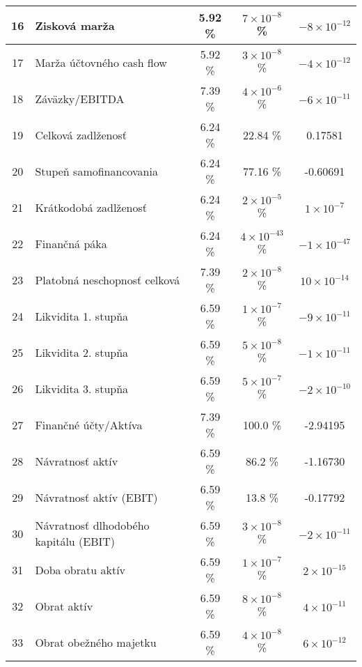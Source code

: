\begin{longtable}{ |c|p{5cm}|c|c|c| }
        \hline
        16 & Zisková marža & 5.92 \% & \(7 \times 10^{-8}\) \% & \(-8 \times 10^{-12}\) \\
        \hline
        17 & Marža účtovného cash flow & 5.92 \% & \(3 \times 10^{-8}\) \% & \(-4 \times 10^{-12}\) \\
        \hline
        18 & Záväzky/EBITDA & 7.39 \% & \(4 \times 10^{-6}\) \% & \(-6 \times 10^{-11}\) \\
        \hline
        19 & Celková zadlženosť & 6.24 \% & 22.84 \% & 0.17581 \\
        \hline
        20 & Stupeň samofinancovania & 6.24 \% & 77.16 \% & -0.60691 \\
        \hline
        21 & Krátkodobá zadlženosť & 6.24 \% & \(2 \times 10^{-5}\) \% & \(1 \times 10^{-7}\) \\
        \hline
        22 & Finančná páka & 6.24 \% & \(4 \times 10^{-43}\) \% & \(-1 \times 10^{-47}\) \\
        \hline
        23 & Platobná neschopnosť celková & 7.39 \% & \(2 \times 10^{-8}\) \% & \(10 \times 10^{-14}\) \\
        \hline
        24 & Likvidita 1. stupňa & 6.59 \% & \(1 \times 10^{-7}\) \% & \(-9 \times 10^{-11}\) \\
        \hline
        25 & Likvidita 2. stupňa & 6.59 \% & \(5 \times 10^{-8}\) \% & \(-1 \times 10^{-11}\) \\
        \hline
        26 & Likvidita 3. stupňa & 6.59 \% & \(5 \times 10^{-7}\) \% & \(-2 \times 10^{-10}\) \\
        \hline
        27 & Finančné účty/Aktíva & 7.39 \% & 100.0 \% & -2.94195 \\
        \hline
        28 & Návratnosť aktív & 6.59 \% & 86.2 \% & -1.16730 \\
        \hline
        29 & Návratnosť aktív (EBIT) & 6.59 \% & 13.8 \% & -0.17792 \\
        \hline
        30 & Návratnosť dlhodobého kapitálu (EBIT) & 6.59 \% & \(3 \times 10^{-8}\) \% & \(-2 \times 10^{-11}\) \\
        \hline
        31 & Doba obratu aktív & 6.59 \% & \(1 \times 10^{-7}\) \% & \(2 \times 10^{-15}\) \\
        \hline
        32 & Obrat aktív & 6.59 \% & \(8 \times 10^{-8}\) \% & \(4 \times 10^{-11}\) \\
        \hline
        33 & Obrat obežného majetku & 6.59 \% & \(4 \times 10^{-8}\) \% & \(6 \times 10^{-12}\) \\

\end{longtable}
